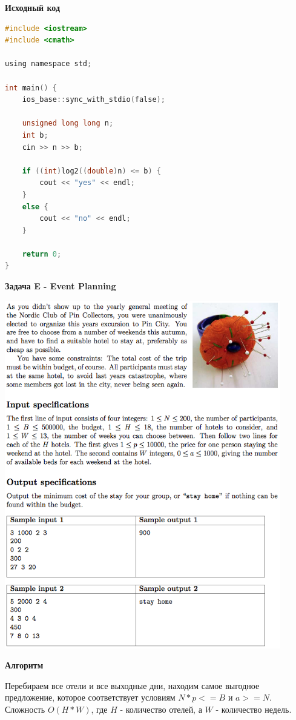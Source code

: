 \documentclass[a4paper,12pt]{article}
\begin{document}
\newpage
\textbf{{\large Исходный код}} \\
\begin{lstlisting}[language=C]
#include <iostream>
#include <cmath>

using namespace std;

int main() {
    ios_base::sync_with_stdio(false);
    
    unsigned long long n;
    int b;
    cin >> n >> b;
    
    if ((int)log2((double)n) <= b) {
        cout << "yes" << endl;
    }
    else {
        cout << "no" << endl;
    }

    return 0;
}
\end{lstlisting}


\newpage
\textbf{{\large Задача E - Event Planning}}

\begin{center}
\includegraphics[width=0.9\textwidth]{CT_S02E03/CT_S02E03_E.png}\\ [1cm]
\end{center}

\textbf{{\large Алгоритм}}

Перебираем все отели и все выходные дни, находим самое выгодное предложение, которое соответствует условиям $N * p <= B$ и $a >= N$. Сложность $O(H*W)$, где $H$ - количество отелей, а $W$ - количество недель.
\end{document}
